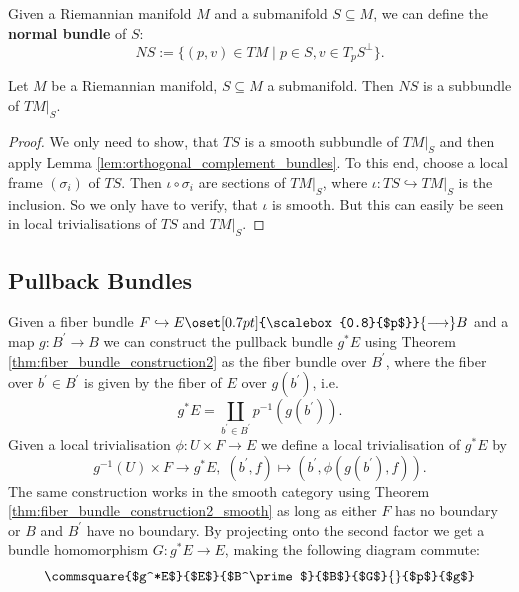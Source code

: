     Given a Riemannian manifold $M$ and a submanifold $S \subseteq M$, we can define the \textbf{normal bundle} of $S$:
    \[NS := \{(p,v) \in TM \mid p \in S, v \in T_pS^\perp\}.\]
    \begin{corollary}
        Let $M$ be a Riemannian manifold, $S\subseteq M$ a submanifold. Then $NS$ is a subbundle of $TM|_S$.
    \end{corollary}
    \begin{proof}
        We only need to show, that $TS$ is a smooth subbundle of $TM|_S$ and then apply Lemma \ref{lem:orthogonal_complement_bundles}. To this end, choose a local frame $(\sigma_i)$ of $TS$. Then $\iota \circ \sigma_i$ are sections of $TM|_S$, where $\iota \colon TS \hookrightarrow TM|_S$ is the inclusion. So we only have to verify, that $\iota$ is smooth. But this can easily be seen in local trivialisations of $TS$ and $TM|_S$.
    \end{proof}

    \subsection{Pullback Bundles}

    Given a fiber bundle $F \hookrightarrow E \oset[0.7pt]{\scalebox{0.8}{$p$}}{\longrightarrow} B$ and a map $g \colon B^\prime \to B$ we can construct the pullback bundle $g^*E$ using Theorem \ref{thm:fiber_bundle_construction2} as the fiber bundle over $B^\prime$, where the fiber over $b^\prime \in B^\prime$ is given by the fiber of $E$ over $g(b^\prime)$, i.e.
    \[
    g^*E = \coprod_{b^\prime \in B^\prime} p^{-1}(g(b^\prime)).
    \]
    Given a local trivialisation $\phi \colon U \times F \to E$ we define a local trivialisation of $g^*E$ by
    \[
    g^{-1}(U) \times F \to g^*E, \; (b^\prime,f) \mapsto (b^\prime,\phi(g(b^\prime),f)).
    \]
    The same construction works in the smooth category using Theorem \ref{thm:fiber_bundle_construction2_smooth} as long as either $F$ has no boundary or $B$ and $B^\prime$ have no boundary. By projecting onto the second factor we get a bundle homomorphism $G \colon g^*E \to E$, making the following diagram commute:
    \[
        \commsquare{$g^*E$}{$E$}{$B^\prime$}{$B$}{$G$}{}{$p$}{$g$}
    \]

